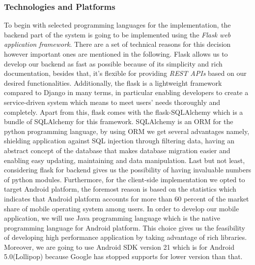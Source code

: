\subsubsection{Technologies and Platforms}
To begin with selected programming languages for the implementation, the backend part of the system is going to be implemented using the  \emph{Flask web application framework}. There are a set of technical reasons for this decision however important ones are mentioned in the following. Flask allows us to develop our backend as fast as possible because of its simplicity and rich documentation, besides that, it’s flexible for providing  \emph{REST APIs} based on our desired functionalities. Additionally, the flask is a lightweight framework compared to Django in many terms, in particular enabling developers to create a service-driven system which means to meet users’ needs thoroughly and completely. Apart from this, flask comes with the flask-SQLAlchemy which is a bundle of SQLAlchemy for this framework. SQLAlchemy is an ORM for the python programming language, by using ORM we get several advantages namely, shielding application against SQL injection through filtering data, having an abstract concept of the database that makes database migration easier and enabling easy updating, maintaining and data manipulation. Last but not least, considering flask for backend gives us the possibility of having invaluable numbers of python modules.
Furthermore, for the client-side implementation we opted to target Android platform, the foremost reason is based on the statistics which indicates that Android platform accounts for more than 60 percent of the market share of mobile operating system among users. In order to develop our mobile application, we will use Java programming language which is the native programming language for Android platform. This choice gives us the feasibility of developing high performance application by taking advantage of rich libraries. Moreover, we are going to use Android SDK version 21 which is for Android 5.0(Lollipop) because Google has stopped supports for lower version than that. 


